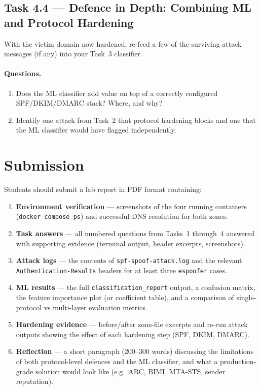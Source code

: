 \documentclass[11pt]{article}
\begin{document}
\subsection{Task 4.4 --- Defence in Depth: Combining ML and Protocol Hardening}

With the victim domain now hardened, re-feed a few of the surviving
attack messages (if any) into your Task~3 classifier.

\paragraph{Questions.}
\begin{enumerate}[noitemsep]
  \item Does the ML classifier add value on top of a correctly
        configured SPF/DKIM/DMARC stack? Where, and why?
  \item Identify one attack from Task~2 that protocol hardening blocks
        and one that the ML classifier would have flagged independently.
\end{enumerate}

\section{Submission}

Students should submit a lab report in PDF format containing:

\begin{enumerate}[noitemsep]
  \item \textbf{Environment verification} --- screenshots of the four
    running containers (\texttt{docker compose ps}) and successful DNS
    resolution for both zones.
  \item \textbf{Task answers} --- all numbered questions from Tasks~1
    through~4 answered with supporting evidence (terminal output,
    header excerpts, screenshots).
  \item \textbf{Attack logs} --- the contents of
    \texttt{spf-spoof-attack.log} and the relevant
    \texttt{Authentication-Results} headers for at least three
    \texttt{espoofer} cases.
  \item \textbf{ML results} --- the full \texttt{classification\_report}
    output, a confusion matrix, the feature importance plot (or
    coefficient table), and a comparison of single-protocol vs
    multi-layer evaluation metrics.
  \item \textbf{Hardening evidence} --- before/after zone-file excerpts
    and re-run attack outputs showing the effect of each hardening
    step (SPF, DKIM, DMARC).
  \item \textbf{Reflection} --- a short paragraph (200--300 words)
    discussing the limitations of both protocol-level defences and the
    ML classifier, and what a production-grade solution would look like
    (e.g.\ ARC, BIMI, MTA-STS, sender reputation).
\end{enumerate}
\end{document}
